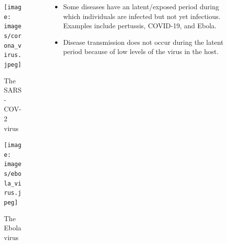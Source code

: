 \documentclass[
  ignorenonframetext,
]{beamer}
\providecommand{\tightlist}{%
  \setlength{\itemsep}{0pt}\setlength{\parskip}{0pt}}\usepackage{longtable,booktabs,array}
\begin{document}
\begin{frame}
\begin{columns}[T]
\begin{column}{0.3\textwidth}
\begin{figure}[H]

{\centering \texttt{[image: images/corona\_virus.jpeg]}

}

\caption{The SARS-COV-2 virus}

\end{figure}%
\begin{figure}[H]

{\centering \texttt{[image: images/ebola\_virus.jpeg]}

}

\caption{The Ebola virus}

\end{figure}%
\end{column}

\begin{column}{0.7\textwidth}
\begin{itemize}
\tightlist
\item
  Some diseases have an {latent/exposed period} during which individuals
  are {infected but not yet infectious}. Examples include pertussis,
  COVID-19, and Ebola.
\item
  Disease transmission does not occur during the latent period because
  of low levels of the virus in the host.
\end{itemize}
\end{column}
\end{columns}
\end{frame}
\end{document}
